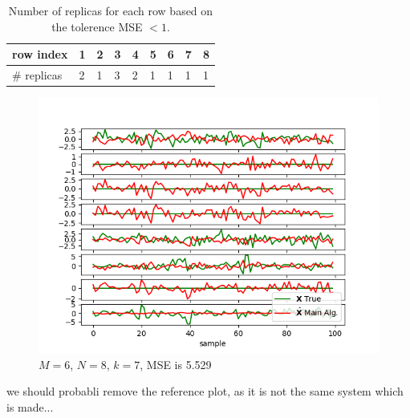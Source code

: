\begin{table}[h]
\center
\begin{tabular}{|l|l|l|l|l|l|l|l|l|}
\hline
row index   & 1 & 2 & 3 & 4 & 5 & 6 & 7 & 8 \\ \hline
\# replicas & 2 & 1 & 3 & 2 & 1 & 1 & 1 & 1 \\ \hline
\end{tabular}
\caption{Number of replicas for each row based on the tolerence MSE $< 1$.}
\label{tab:replica6}
\end{table}

\begin{figure}
\centering
\includegraphics[scale=0.5]{figures/ch_estimate/k_test6.png}
\caption{$M=6$, $N=8$, $k=7$, MSE is 5.529}
\label{fig:ktest6}
\end{figure}

we should probabli remove the reference plot, as it is not the same system which is made... 








